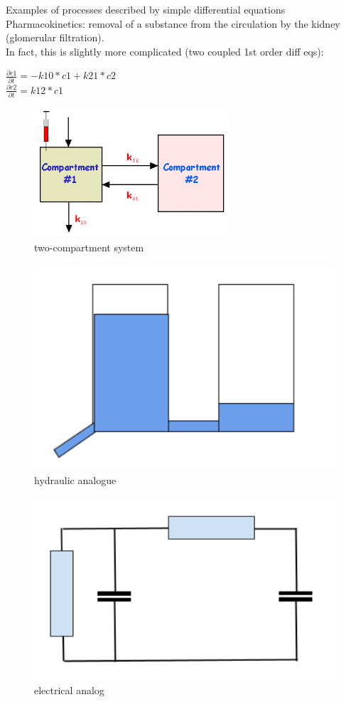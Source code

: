 \documentclass[
  ignorenonframetext,
]{beamer}
\begin{document}
\begin{frame}{Examples of processes described by simple differential
equations}
\protect\hypertarget{examples-of-processes-described-by-simple-differential-equations}{}
Pharmacokinetics: removal of a substance from the circulation by the
kidney (glomerular filtration).\\
In fact, this is slightly more complicated (two coupled 1st order diff
eqs):

\(\frac{\partial c1}{\partial t} = -k10*c1 + k21*c2\)\\
\(\frac{\partial c2}{\partial t} = k12*c1\)

\begin{figure}
\centering
\includegraphics{2c.png}
\caption{two-compartment system}
\end{figure}

\begin{figure}
\centering
\includegraphics{2v.png}
\caption{hydraulic analogue}
\end{figure}

\begin{figure}
\centering
\includegraphics{2RC.png}
\caption{electrical analog}
\end{figure}


\end{frame}
\end{document}

